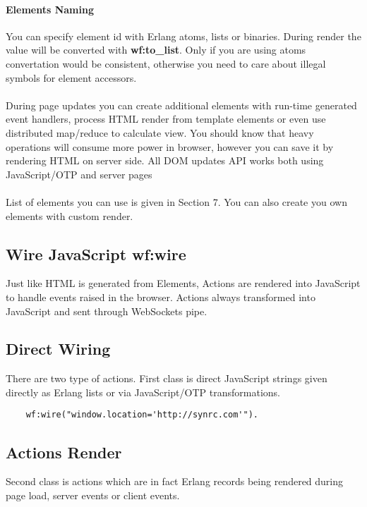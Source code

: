 \paragraph{\bf Elements Naming}
You can specify element id with Erlang atoms,
lists or binaries. During render the value will be converted
with {\bf wf:to\_list}. Only if you are using atoms convertation would be consistent,
otherwise you need to care about illegal symbols for element accessors.

\paragraph{}
During page updates you can create additional elements with
run-time generated event handlers, process HTML render from
template elements or even use distributed map/reduce to calculate view.
You should know that heavy operations will consume
more power in browser, however you can save it by rendering
HTML on server side. All DOM updates API works both using
JavaScript/OTP and server pages 

\paragraph{}
List of elements you can use is given in Section 7. You can also create
you own elements with custom render.

\subsection{Wire JavaScript \bf{wf:wire}}
Just like HTML is generated from Elements, Actions are rendered into
JavaScript to handle events raised in the browser. Actions always
transformed into JavaScript and sent through WebSockets pipe.

\subsection*{Direct Wiring}
There are two type of actions. First class is direct JavaScript
strings given directly as Erlang lists or via JavaScript/OTP
transformations.

\vspace{1\baselineskip}
\begin{lstlisting}
    wf:wire("window.location='http://synrc.com'").
\end{lstlisting}

\subsection*{Actions Render}
Second class is actions which are in fact Erlang records being
rendered during page load, server events or client events.

